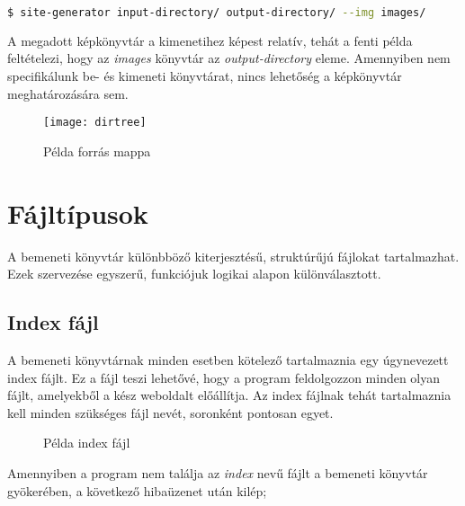 \documentclass[a4paper,10pt]{article}
\begin{document}
\begin{lstlisting}[language=bash]
$ site-generator input-directory/ output-directory/ --img images/
\end{lstlisting}

A megadott képkönyvtár a kimenetihez képest relatív, tehát a fenti példa feltételezi, hogy az \emph{images} könyvtár az \emph{output-directory} eleme.
Amennyiben nem specifikálunk be- és kimeneti könyvtárat, nincs lehetőség a képkönyvtár meghatározására sem.

\begin{figure}[h]
	\begin{center}
		\texttt{[image: dirtree]}
		\caption{Példa forrás mappa}
	\end{center}
\end{figure}


\section{Fájltípusok}
A bemeneti könyvtár különbböző kiterjesztésű, struktúrűjú fájlokat tartalmazhat. Ezek szervezése egyszerű, funkciójuk logikai alapon különválasztott.

\subsection{Index fájl}
A bemeneti könyvtárnak minden esetben kötelező tartalmaznia egy úgynevezett index fájlt. Ez a fájl teszi lehetővé, hogy a program feldolgozzon minden olyan fájlt, amelyekből a kész weboldalt előállítja.
Az index fájlnak tehát tartalmaznia kell minden szükséges fájl nevét, soronként pontosan egyet.

\begin{wrapfigure}{r}{0.3\textwidth}
		\centering
		\caption{Példa index fájl}
\end{wrapfigure}

Amennyiben a program nem találja az \emph{index} nevű fájlt a bemeneti könyvtár gyökerében, a következő hibaüzenet után kilép;
\end{document}
